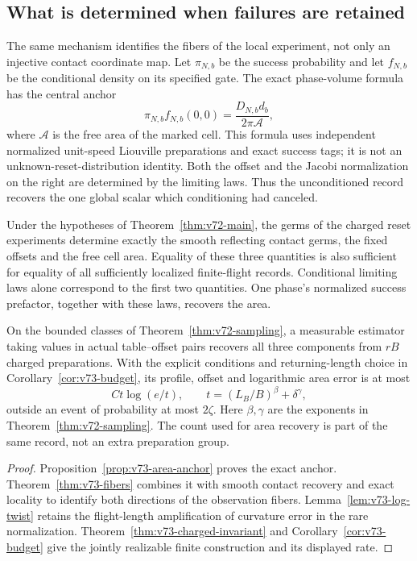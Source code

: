 \subsection{What is determined when failures are retained}

The same mechanism identifies the fibers of the local experiment, not
only an injective contact coordinate map.  Let $\pi_{N,b}$ be the
success probability and let $f_{N,b}$ be the conditional density on its
specified gate.  The exact phase-volume formula has the central anchor
\[
 \pi_{N,b}f_{N,b}(0,0)=\frac{D_{N,b}d_b}{2\pi\mathcal A},
\]
where $\mathcal A$ is the free area of the marked cell.  This formula
uses independent normalized unit-speed Liouville preparations and exact
success tags; it is not an unknown-reset-distribution identity.  Both the offset
and the Jacobi normalization on the right are determined by the limiting
laws.  Thus the unconditioned record recovers the one global scalar
which conditioning had canceled.

\begin{theorem}
\label{thm:v73-main}
Under the hypotheses of Theorem~\ref{thm:v72-main}, the germs of the
charged reset experiments determine exactly the smooth reflecting
contact germs, the fixed offsets and the free cell area.  Equality of
these three quantities is also sufficient for equality of all sufficiently
localized finite-flight records.  Conditional limiting laws alone
correspond to the first two quantities.  One phase's normalized success
prefactor, together with these laws, recovers the area.

On the bounded classes of Theorem~\ref{thm:v72-sampling}, a measurable
estimator taking values in actual table--offset pairs recovers all three
components from $rB$ charged preparations.  With the explicit conditions
and returning-length choice in Corollary~\ref{cor:v73-budget}, its
profile, offset and logarithmic area error is at most
\[
 C t\log(e/t),\qquad t=(L_B/B)^\beta+\delta^\gamma,
\]
outside an event of probability at most $2\zeta$.  Here $\beta,\gamma$
are the exponents in Theorem~\ref{thm:v72-sampling}.  The count used for
area recovery is part of the same record, not an extra preparation group.
\end{theorem}
\begin{proof}
Proposition~\ref{prop:v73-area-anchor} proves the exact anchor.
Theorem~\ref{thm:v73-fibers} combines it with smooth contact recovery
and exact locality to identify both directions of the observation fibers.
Lemma~\ref{lem:v73-log-twist} retains the flight-length amplification
of curvature error in the rare normalization.
Theorem~\ref{thm:v73-charged-invariant} and
Corollary~\ref{cor:v73-budget} give the jointly realizable finite
construction and its displayed rate.
\end{proof}

